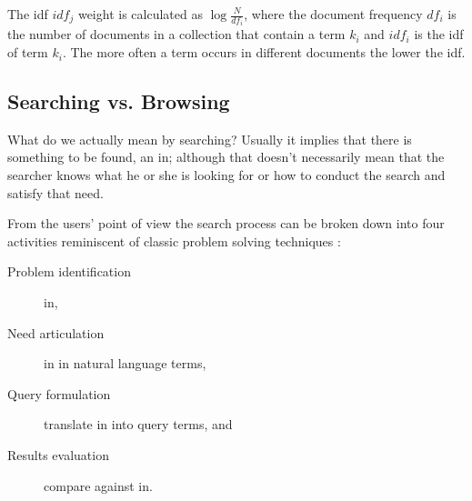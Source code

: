 The \ac{idf} $idf_j$ weight is calculated as $\log \frac{N}{df_i}$, where the document frequency $df_i$ is the number of documents in a collection that contain a term $k_i$ and $idf_i$ is the \ac{idf} of term $k_i$. The more often a term occurs in different documents the lower the \ac{idf}.





\subsection{Searching vs. Browsing}


What do we actually mean by searching? Usually it implies that there is something to be found, an \ac{in}; although that doesn’t necessarily mean that the searcher knows what he or she is looking for or how to conduct the search and satisfy that need.

From the users' point of view the search process can be broken down into four activities \autocite{Sutcliffe1998} reminiscent of classic problem solving techniques \autocite{Polya1957}:

\begin{description}
  \item [Problem identification] \ac{in},
  \item [Need articulation] \ac{in} in natural language terms,
  \item [Query formulation] translate \ac{in} into query terms, and
  \item [Results evaluation] compare against \ac{in}.
\end{description}

